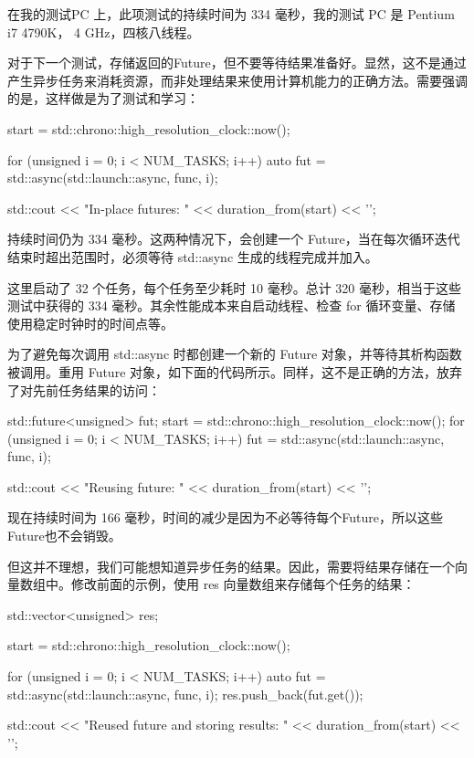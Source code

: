在我的测试PC 上，此项测试的持续时间为 334 毫秒，我的测试 PC 是 Pentium i7 4790K， 4 GHz，四核八线程。

对于下一个测试，存储返回的Future，但不要等待结果准备好。显然，这不是通过产生异步任务来消耗资源，而非处理结果来使用计算机能力的正确方法。需要强调的是，这样做是为了测试和学习：

\begin{cpp}
start = std::chrono::high_resolution_clock::now();

for (unsigned i = 0; i < NUM_TASKS; i++) {
    auto fut = std::async(std::launch::async, func, i);
}

std::cout << "In-place futures: "
          << duration_from(start) << '\n';
\end{cpp}

持续时间仍为 334 毫秒。这两种情况下，会创建一个 Future，当在每次循环迭代结束时超出范围时，必须等待 std::async 生成的线程完成并加入。

这里启动了 32 个任务，每个任务至少耗时 10 毫秒。总计 320 毫秒，相当于这些测试中获得的 334 毫秒。其余性能成本来自启动线程、检查 for 循环变量、存储使用稳定时钟时的时间点等。

为了避免每次调用 std::async 时都创建一个新的 Future 对象，并等待其析构函数被调用。重用 Future 对象，如下面的代码所示。同样，这不是正确的方法，放弃了对先前任务结果的访问：

\begin{cpp}
std::future<unsigned> fut;
start = std::chrono::high_resolution_clock::now();
for (unsigned i = 0; i < NUM_TASKS; i++) {
    fut = std::async(std::launch::async, func, i);
}

std::cout << "Reusing future: "
          << duration_from(start) << '\n';
\end{cpp}

现在持续时间为 166 毫秒，时间的减少是因为不必等待每个Future，所以这些Future也不会销毁。

但这并不理想，我们可能想知道异步任务的结果。因此，需要将结果存储在一个向量数组中。修改前面的示例，使用 res 向量数组来存储每个任务的结果：

\begin{cpp}
std::vector<unsigned> res;

start = std::chrono::high_resolution_clock::now();

for (unsigned i = 0; i < NUM_TASKS; i++) {
    auto fut = std::async(std::launch::async, func, i);
    res.push_back(fut.get());
}

std::cout << "Reused future and storing results: "
          << duration_from(start) << '\n';
\end{cpp}

